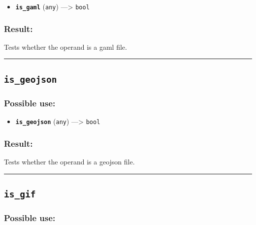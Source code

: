 \documentclass[]{book}
\providecommand{\tightlist}{%
  \setlength{\itemsep}{0pt}\setlength{\parskip}{0pt}}
\theoremstyle{definition}
\theoremstyle{definition}
\theoremstyle{definition}
\theoremstyle{remark}
\begin{document}
\begin{itemize}
\tightlist
\item
  \textbf{\texttt{is\_gaml}} (\texttt{any}) ---\textgreater{}
  \texttt{bool}
\end{itemize}

\subsubsection{Result:}\label{result-279}

Tests whether the operand is a gaml file.

\begin{center}\rule{0.5\linewidth}{\linethickness}\end{center}

\subsection{\texorpdfstring{\texttt{is\_geojson}}{is\_geojson}}\label{is_geojson}

\subsubsection{Possible use:}\label{possible-use-290}

\begin{itemize}
\tightlist
\item
  \textbf{\texttt{is\_geojson}} (\texttt{any}) ---\textgreater{}
  \texttt{bool}
\end{itemize}

\subsubsection{Result:}\label{result-280}

Tests whether the operand is a geojson file.

\begin{center}\rule{0.5\linewidth}{\linethickness}\end{center}

\subsection{\texorpdfstring{\texttt{is\_gif}}{is\_gif}}\label{is_gif}

\subsubsection{Possible use:}\label{possible-use-291}
\end{document}
